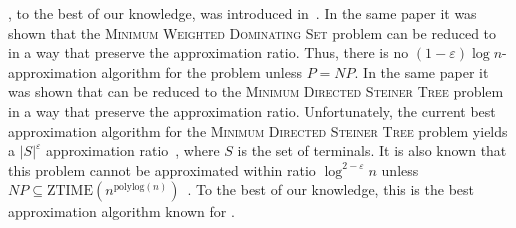 \Prob{}, to the best of our knowledge, was introduced in~\cite{shin2010approximation}.
In the same paper it was shown that the \textsc{Minimum Weighted Dominating Set} problem 
can be reduced to \Prob{} in a way that preserve the approximation ratio.
Thus, there is no $(1 - \varepsilon)\log n$-approximation algorithm for the \Prob{} problem
unless $P = NP$.
In the same paper it was shown that \Prob{} can be reduced to the 
\textsc{Minimum Directed Steiner Tree} problem in a way that preserve the approximation ratio.
Unfortunately, the current best approximation algorithm for the 
\textsc{Minimum Directed Steiner Tree} problem yields a $|S|^\varepsilon$ 
approximation ratio~\cite{charikar1999approximation},
where $S$ is the set of terminals.
It is also known that this problem cannot be approximated within ratio 
$\log^{2 - \varepsilon} n$ 
unless $NP \subseteq \text{ZTIME}(n^{\text{polylog}(n)})$~\cite{halperin2003polylogarithmic}.
To the best of our knowledge, this is the best approximation algorithm known for \Prob{}.
     
